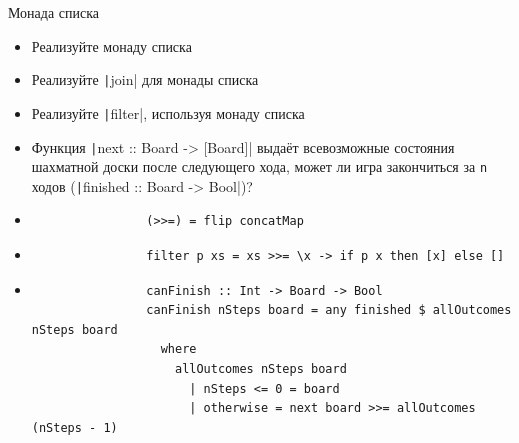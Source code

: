     \begin{frame}[fragile]{Монада списка}
        \begin{itemize}
            \item[\todo] Реализуйте монаду списка
            \item[\todo] Реализуйте \texttt|join| для монады списка
            \item[\todo] Реализуйте \texttt|filter|, используя монаду списка
            \item[\todo] Функция \texttt|next :: Board -> [Board]| выдаёт всевозможные состояния шахматной доски после следующего хода, может ли игра закончиться за \texttt{n} ходов (\texttt|finished :: Board -> Bool|)?
            \item[\answer] \pause
            \begin{verbatim}
                (>>=) = flip concatMap
            \end{verbatim}
            \item[\answer] \pause
            \begin{verbatim}
                filter p xs = xs >>= \x -> if p x then [x] else []
            \end{verbatim}
            \item[\answer] \pause
            \begin{verbatim}
                canFinish :: Int -> Board -> Bool
                canFinish nSteps board = any finished $ allOutcomes nSteps board
                  where
                    allOutcomes nSteps board
                      | nSteps <= 0 = board
                      | otherwise = next board >>= allOutcomes (nSteps - 1)
            \end{verbatim}
        \end{itemize}
    \end{frame}
    

